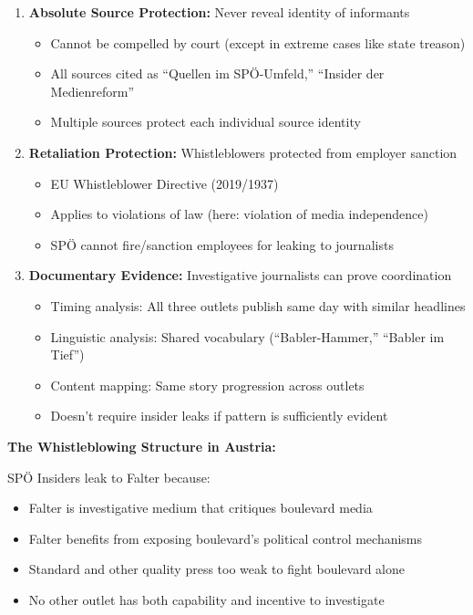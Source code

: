 \begin{enumerate}
\item \textbf{Absolute Source Protection:} Never reveal identity of informants
  \begin{itemize}
  \item Cannot be compelled by court (except in extreme cases like state treason)
  \item All sources cited as ``Quellen im SPÖ-Umfeld,'' ``Insider der Medienreform''
  \item Multiple sources protect each individual source identity
  \end{itemize}

\item \textbf{Retaliation Protection:} Whistleblowers protected from employer sanction
  \begin{itemize}
  \item EU Whistleblower Directive (2019/1937)
  \item Applies to violations of law (here: violation of media independence)
  \item SPÖ cannot fire/sanction employees for leaking to journalists
  \end{itemize}

\item \textbf{Documentary Evidence:} Investigative journalists can prove coordination
  \begin{itemize}
  \item Timing analysis: All three outlets publish same day with similar headlines
  \item Linguistic analysis: Shared vocabulary (``Babler-Hammer,'' ``Babler im Tief'')
  \item Content mapping: Same story progression across outlets
  \item Doesn't require insider leaks if pattern is sufficiently evident
  \end{itemize}
\end{enumerate}

\textbf{The Whistleblowing Structure in Austria:}

SPÖ Insiders leak to Falter because:
\begin{itemize}
\item Falter is investigative medium that critiques boulevard media
\item Falter benefits from exposing boulevard's political control mechanisms
\item Standard and other quality press too weak to fight boulevard alone
\item No other outlet has both capability and incentive to investigate
\end{itemize}

